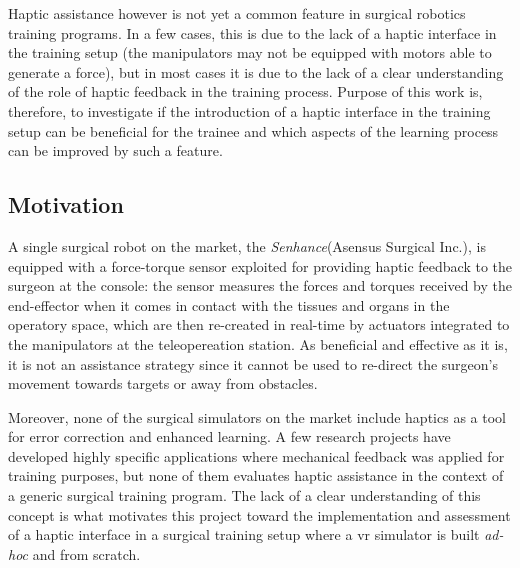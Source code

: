 \documentclass[../main.tex]{subfiles}
\begin{document}
Haptic assistance however is not yet a common feature in surgical robotics training programs. In a few cases, this is due to the lack of a haptic interface in the training setup (the manipulators may not be equipped with motors able to generate a force), but in most cases it is due to the lack of a clear understanding of the role of haptic feedback in the training process. Purpose of this work is, therefore, to investigate if the introduction of a haptic interface in the training setup can be beneficial for the trainee and which aspects of the learning process can be improved by such a feature.
\subsection{Motivation}
A single surgical robot on the market, the \textit{Senhance}\cright (Asensus Surgical Inc.), is equipped with a force-torque sensor exploited for providing haptic feedback to the surgeon at the console: the sensor measures the forces and torques received by the end-effector when it comes in contact with the tissues and organs in the operatory space, which are then re-created in real-time by actuators integrated to the manipulators at the teleopereation station. As beneficial and effective as it is, it is not an assistance strategy since it cannot be used to re-direct the surgeon's movement towards targets or away from obstacles.

Moreover, none of the surgical simulators on the market include haptics as a tool for error correction and enhanced learning. A few research projects have developed highly specific applications where mechanical feedback was applied for training purposes, but none of them evaluates haptic assistance in the context of a generic surgical training program. The lack of a clear understanding of this concept is what motivates this project toward the implementation and assessment of a haptic interface in a surgical training setup where a \ac{vr} simulator is built \textit{ad-hoc} and from scratch.



\end{document}
